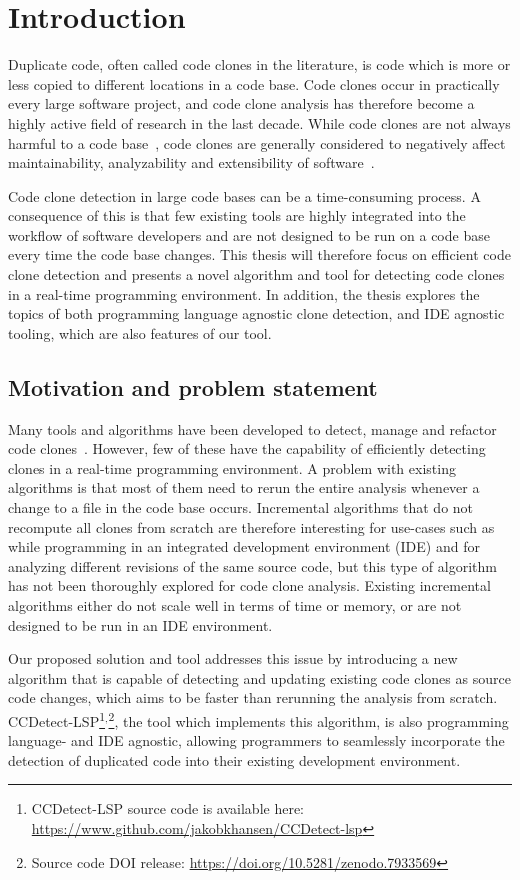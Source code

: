 \chapter{Introduction}

Duplicate code, often called code clones in the literature, is code which is more or less
copied to different locations in a code base. Code clones occur in practically every large
software project, and code clone analysis has therefore become a highly active field of
research in the last decade. While code clones are not always harmful to a code
base~\cite[209]{Inoue_introduction_to_cc}, code clones are generally considered to
negatively affect maintainability, analyzability and extensibility of
software~\cite[22]{Inoue_introduction_to_cc}.

Code clone detection in large code bases can be a time-consuming process. A consequence of
this is that few existing tools are highly integrated into the workflow of software
developers and are not designed to be run on a code base every time the code base changes.
This thesis will therefore focus on efficient code clone detection and presents a novel
algorithm and tool for detecting code clones in a real-time programming environment. In
addition, the thesis explores the topics of both programming language agnostic clone
detection, and IDE agnostic tooling, which are also features of our tool.

\section{Motivation and problem statement}

Many tools and algorithms have been developed to detect, manage and refactor code
clones~\cite[6]{Inoue_introduction_to_cc}. However, few of these have the capability of
efficiently detecting clones in a real-time programming environment. A problem with
existing algorithms is that most of them need to rerun the entire analysis whenever a
change to a file in the code base occurs. Incremental algorithms that do not recompute all
clones from scratch are therefore interesting for use-cases such as while programming in
an integrated development environment (IDE) and for analyzing different revisions of the
same source code, but this type of algorithm has not been thoroughly explored for code
clone analysis. Existing incremental algorithms either do not scale well in terms of time
or memory, or are not designed to be run in an IDE environment.

Our proposed solution and tool addresses this issue by introducing a new algorithm that is
capable of detecting and updating existing code clones as source code changes, which aims
to be faster than rerunning the analysis from scratch. CCDetect-LSP\footnote{CCDetect-LSP source code is
available here: \url{https://www.github.com/jakobkhansen/CCDetect-lsp}}$^{,}$\footnote{Source
code DOI release: \url{https://doi.org/10.5281/zenodo.7933569}}, the tool which
implements this algorithm, is also programming language- and IDE agnostic, allowing
programmers to seamlessly incorporate the detection of duplicated code into their existing
development environment.

